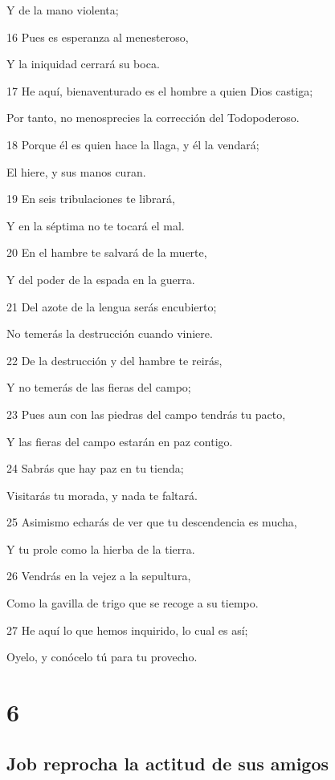 \par Y de la mano violenta;
\par 16 Pues es esperanza al menesteroso,
\par Y la iniquidad cerrará su boca.
\par 17 He aquí, bienaventurado es el hombre a quien Dios castiga;
\par Por tanto, no menosprecies la corrección del Todopoderoso. 
\par 18 Porque él es quien hace la llaga, y él la vendará;
\par El hiere, y sus manos curan.
\par 19 En seis tribulaciones te librará,
\par Y en la séptima no te tocará el mal.
\par 20 En el hambre te salvará de la muerte,
\par Y del poder de la espada en la guerra.
\par 21 Del azote de la lengua serás encubierto;
\par No temerás la destrucción cuando viniere.
\par 22 De la destrucción y del hambre te reirás,
\par Y no temerás de las fieras del campo;
\par 23 Pues aun con las piedras del campo tendrás tu pacto,
\par Y las fieras del campo estarán en paz contigo.
\par 24 Sabrás que hay paz en tu tienda;
\par Visitarás tu morada, y nada te faltará.
\par 25 Asimismo echarás de ver que tu descendencia es mucha,
\par Y tu prole como la hierba de la tierra.
\par 26 Vendrás en la vejez a la sepultura,
\par Como la gavilla de trigo que se recoge a su tiempo.
\par 27 He aquí lo que hemos inquirido, lo cual es así;
\par Oyelo, y conócelo tú para tu provecho.

\chapter{6}

\section*{Job reprocha la actitud de sus amigos}

